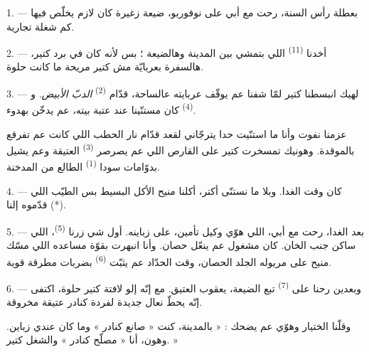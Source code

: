 
\VUsaut{4.0mm}
\VUsaut{3.0mm}
\VUfilet{16mm}
\VUsaut{5.6mm}
\VUsaut{3.0mm}

\VUsaut{3.0mm}

\VUsaut{4.0mm}

1. --- بعطلة رأس السنة، رحت مع أبي على نوفوربو، ضيعة زغيرة كان لازم
يخلّص فيها كم شغلة تجارية.

2. --- أخدنا  \textsuperscript{(11)} اللي بتمشي بين
المدينة وهالضيعة ؛ بس لأنه كان في برد كتير، هالسفرة بعربايّة مش كتير
مريحة ما كانت حلوة.

3. --- لهيك انبسطنا كتير لمّا شفنا  عم يوقّف عربايته
عالساحة، قدّام  \textsuperscript{(2)} \textit{الدبّ الأبيض}.
و \textsuperscript{(4)} كان مستنّينا عند عتبة بيته، عم يدخّن
 بهدوء.

عزمنا نفوت وأنا ما استنّيت حدا يترجّاني لقعد قدّام نار الحطب اللي كانت
عم تفرقع بالموقدة. وهونيك تمسخرت كتير على  القارص
اللي عم يصرصر  \textsuperscript{(3)} العتيقة وعم يشيل
بدوّامات سودا  \textsuperscript{(1)} الطالع من المدخنة.

4. --- كان وقت الغدا. وبلا ما نستنّى أكتر، أكلنا منيح الأكل البسيط بس
الطيّب اللي قدّموه إلنا (*).

\VUsaut{3.0mm}

5. --- بعد الغدا، رحت مع أبي، اللي هوّي وكيل تأمين، على زباينه. أول شي
زرنا  \textsuperscript{(5)}، اللي ساكن جنب الخان. كان مشغول
عم ينعّل حصان. وأنا انبهرت بقوّة مساعده اللي مسّك منيح على مريوله
الجلد  الحصان، وقت الحدّاد عم يثبّت 
\textsuperscript{(6)} بضربات مطرقة قوية.

6. --- وبعدين رحنا على  \textsuperscript{(7)} تبع الضيعة،
يعقوب العتيق. مع إنّه إلو لافتة  كتير حلوة، اكتفى
إنّه يحطّ نعال جديدة لفردة كنادر عتيقة مخروقة.

وقلّنا الختيار وهوّي عم يضحك : « بالمدينة، كنت « صانع كنادر » وما كان
عندي زباين. وهون، أنا « مصلّح كنادر » والشغل كتير. »

